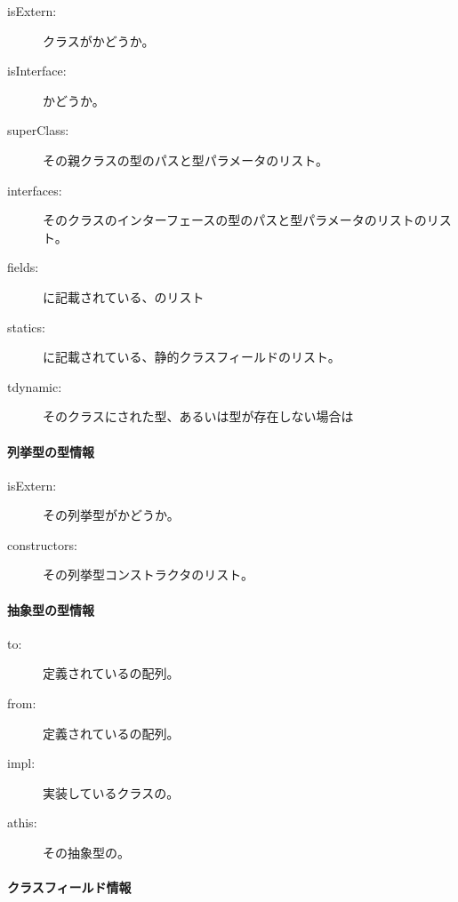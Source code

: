 \begin{description}
	\item[isExtern:] クラスがかどうか。
	\item[isInterface:] かどうか。
	\item[superClass:] その親クラスの型のパスと型パラメータのリスト。
	\item[interfaces:] そのクラスのインターフェースの型のパスと型パラメータのリストのリスト。
	\item[fields:] に記載されている、のリスト
	\item[statics:] に記載されている、静的クラスフィールドのリスト。
	\item[tdynamic:] そのクラスにされた型、あるいは型が存在しない場合は
\end{description}

\paragraph{列挙型の型情報}

\begin{description}
	\item[isExtern:] その列挙型がかどうか。
	\item[constructors:] その列挙型コンストラクタのリスト。
\end{description}

\paragraph{抽象型の型情報}

\begin{description}
	\item[to:] 定義されているの配列。
	\item[from:] 定義されているの配列。
	\item[impl:] 実装しているクラスの。
	\item[athis:] その抽象型の。
\end{description}
	
	
\paragraph{クラスフィールド情報}
\label{cr-rtti-class-field-information}

